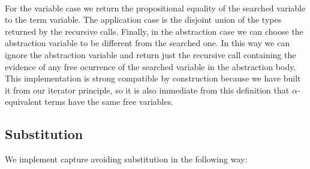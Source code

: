\documentclass{entcs}
\begin{document}

\begin{code}%
\> \AgdaSymbol{:}     \<%
\\
\>\AgdaSymbol{(}\AgdaSymbol{)}  \AgdaSymbol{=}        \AgdaSymbol{)}  \AgdaSymbol{(}\AgdaFunction{[}  \AgdaFunction{]} \AgdaInductiveConstructor{,}  \AgdaBound{\_}  \AgdaSymbol{)} \<%
\end{code}


\noindent For the variable case we return the propositional equality of the searched variable to the term variable. The application case is the disjoint union of the types returned by the recursive calls. Finally, in the abstraction case we can choose the abstraction variable to be different from the searched one. In this way we can ignore the abstraction variable and return just the recursive call containing the evidence of any free ocurrence of the searched variable in the abstraction body. 
This implementation is strong compatible by construction because we have built it from our iterator principle, so it is also immediate from this definition that $\alpha$-equivalent terms have the same free variables.


\subsection{Substitution}
\label{subst}

We implement capture avoiding substitution in the following way:
\end{document}
